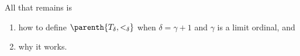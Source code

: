 \begin{boxconstruction}
    All that remains is
    \begin{enumerate}
        \item how to define $\parenth{T_{\delta}, <_{\delta}}$ when $\delta = \gamma + 1$ and $\gamma$ is a limit ordinal, and
        \item why it works.
    \end{enumerate}
    \sorry
\end{boxconstruction}
